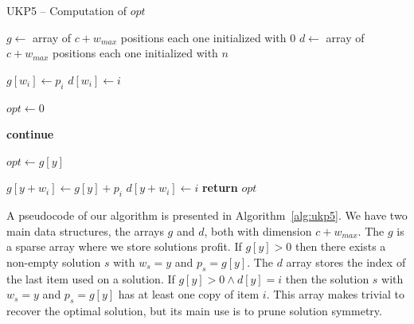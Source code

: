 \documentclass[runningheads,a4paper]{llncs}
\begin{document}
\begin{algorithm}[!t]
\caption{UKP5 -- Computation of $opt$}\label{alg:ukp5}
\begin{algorithmic}[1]
  \State \(g \gets\) array of \(c + w_{max}\) positions each one initialized with \(0\)\label{create_g}
  \State \(d \gets\) array of \(c + w_{max}\) positions each one initialized with \(n\)\label{create_d}
  
  \label{begin_trivial_bounds}
      \State \(g[w_i] \gets p_i\)
      \State \(d[w_i] \gets i\)
    \EndIf
  \EndFor\label{end_trivial_bounds}

  \State \(opt \gets 0\)\label{init_opt}

  \label{main_ext_loop_begin}
    \label{if_less_than_opt_begin}
    	\State \textbf{continue}\label{alg:continue}
    \EndIf\label{if_less_than_opt_end}
    
    \State \(opt \gets g[y]\)\label{update_opt}
    
    \label{main_inner_loop_begin}
      \label{if_new_lower_bound_begin}
        \State \(g[y + w_i] \gets g[y] + p_i\)
        \State \(d[y + w_i] \gets i\)
      \EndIf\label{if_new_lower_bound_end}
    \EndFor\label{main_inner_loop_end}
  \EndFor\label{main_ext_loop_end}
  \State \textbf{return} \(opt\)

\EndProcedure
\end{algorithmic}
\end{algorithm}

A pseudocode of our algorithm is presented in Algorithm~\ref{alg:ukp5}.
We have two main data structures, the arrays \(g\) and \(d\), both with dimension \(c + w_{max}\). 
The \(g\) is a sparse array where we store solutions profit. If \(g[y] > 0\) then there exists a non-empty solution \(s\) with \(w_s = y\) and \(p_s = g[y]\). 
The \(d\) array stores the index of the last item used on a solution. If \(g[y] > 0 \land d[y] = i\) then the solution \(s\) with \(w_s = y\) and \(p_s = g[y]\) has at least one copy of item \(i\). 
This array makes trivial to recover the optimal solution, but its main use is to prune solution symmetry.
\end{document}
